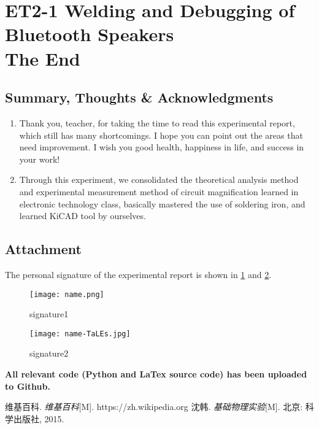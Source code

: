 
\section{ET2-1 Welding and Debugging of Bluetooth Speakers \\ The End}


\subsection{Summary, Thoughts \& Acknowledgments}
\begin{enumerate}
	\item Thank you, teacher, for taking the time to read this experimental report, which still has many shortcomings. I hope you can point out the areas that need improvement. I wish you good health, happiness in life, and success in your work!
	\item Through this experiment, we consolidated the theoretical analysis method and experimental measurement method of circuit magnification learned in electronic technology class, basically mastered the use of soldering iron, and learned KiCAD tool by ourselves.
\end{enumerate}


\subsection{Attachment}

The personal signature of the experimental report is shown in \cref{fig:name1} and \cref{fig:name2}.

\begin{figure}[htbp]
	\centering
	\texttt{[image: name.png]}
	\caption{signature1}
	\label{fig:name1}
\end{figure}

\begin{figure}[htbp]
	\centering
	\texttt{[image: name-TaLEs.jpg]}
	\caption{signature2}
	\label{fig:name2}
\end{figure}

\textbf{All relevant code (Python and LaTex source code) has been uploaded to Github.}


\renewcommand{\refname}{Reference}
\begin{thebibliography}{99}	
	 维基百科. \emph{维基百科}[M]. https://zh.wikipedia.org
	 沈韩. \emph{基础物理实验}[M]. 北京: 科学出版社, 2015.	
\end{thebibliography}